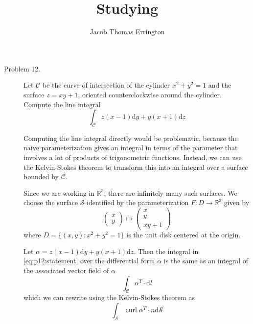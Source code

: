 \documentclass[letterpaper,11pt]{article}
\author{Jacob Thomas Errington}
\title{Studying}
\date{}
\renewcommand{\d}{\mathrm{d}}
\newcommand{\R}{\mathbb{R}}
\newcommand{\parens}[1]{\left(#1\right)}
\DeclareMathOperator{\curl}{\mathrm{curl}}
\begin{document}
\maketitle

\begin{description}
    \item[Problem 12.]
        Let $\mathcal{C}$ be the curve of intersection of the cylinder
        $x^2 + y^2 = 1$ and the surface $z = xy + 1$, oriented counterclockwise
        around the cylinder. Compute the line integral
        \begin{equation}
            \int_{\mathcal{C}} z(x-1) \d y + y(x+1) \d z
            \label{eq:p12:statement}
        \end{equation}

        Computing the line integral directly would be problematic, because the
        naive parameterization gives an integral in terms of the parameter that
        involves a lot of products of trigonometric functions. Instead, we can
        use the Kelvin-Stokes theorem to transform this into an integral over a
        surface bounded by $\mathcal{C}$.

        Since we are working in $\R^3$, there are infinitely many such
        surfaces. We choose the surface $\mathcal{S}$ identified by the
        parameterization $F : D \to \R^3$ given by
        \begin{equation}
            \parens{
                \begin{array}{c}
                    x \\
                    y
                \end{array}
            }
            \mapsto
            \parens{
                \begin{array}{c}
                    x \\
                    y \\
                    xy + 1
                \end{array}
            }
            \label{eq:p12:prmzn}
        \end{equation}
        where $D = \{(x, y) : x^2 + y^2 = 1\}$ is the unit disk centered at the
        origin.

        Let $\alpha = z(x-1)\d y + y(x+1) \d z$. Then the integral in
        \eqref{eq:p12:statement} over the differential form $\alpha$ is the
        same as an integral of the associated vector field of $\alpha$
        \begin{equation*}
            \int_{\mathcal{C}} \alpha^T \cdot \d l
        \end{equation*}
        which we can rewrite using the Kelvin-Stokes theorem as
        \begin{equation}
            \int_{\mathcal{S}} \curl{\alpha^T} \cdot n \d \mathcal{S}
            \label{eq:p12:afterks}
        \end{equation}


\end{description}
\end{document}
